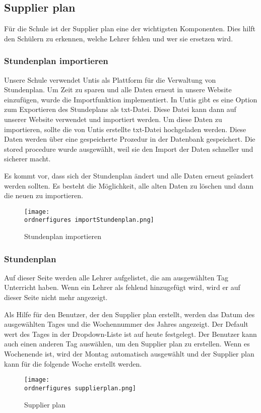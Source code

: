 \subsection{Supplier plan}
Für die Schule ist der Supplier plan eine der wichtigsten Komponenten. Dies hilft den Schülern zu erkennen, welche Lehrer fehlen und wer sie ersetzen wird.

\subsubsection{Stundenplan importieren}
Unsere Schule verwendet Untis als Plattform für die Verwaltung von Stundenplan. Um Zeit zu sparen und alle Daten erneut in unsere Website einzufügen, wurde die Importfunktion implementiert. In Untis gibt es eine Option zum Exportieren des Stundeplans als txt-Datei. Diese Datei kann dann auf unserer Website verwendet und importiert werden.
Um diese Daten zu importieren, sollte die von Untis erstellte txt-Datei hochgeladen werden. Diese Daten werden über eine gespeicherte Prozedur in der Datenbank gespeichert. Die stored procedure wurde ausgewählt, weil sie den Import der Daten schneller und sicherer macht.

Es kommt vor, dass sich der Stundenplan ändert und alle Daten erneut geändert werden sollten. Es besteht die Möglichkeit, alle alten Daten zu löschen und dann die neuen zu importieren.
\begin{figure}[H]
	\centering
	\texttt{[image: \\ordnerfigures importStundenplan.png]}
	\caption{Stundenplan importieren}
	\label{fi:import}
\end{figure}

\subsubsection{Stundenplan }

Auf dieser Seite werden alle Lehrer aufgelistet, die am ausgewählten Tag Unterricht haben. Wenn ein Lehrer als fehlend hinzugefügt wird, wird er auf dieser Seite nicht mehr angezeigt.

Als Hilfe für den Benutzer, der den Supplier plan erstellt, werden das Datum des ausgewählten Tages und die Wochennummer des Jahres angezeigt.
Der Default wert des Tages in der Dropdown-Liste ist auf heute festgelegt. Der Benutzer kann auch einen anderen Tag auswählen, um den Supplier plan zu erstellen. Wenn es Wochenende ist, wird der Montag automatisch ausgewählt und der Supplier plan kann für die folgende Woche erstellt werden.
\begin{figure}[H]
	\centering
	\texttt{[image: \\ordnerfigures supplierplan.png]}
	\caption{Supplier plan}
	\label{fi:supplierplan}
\end{figure}

